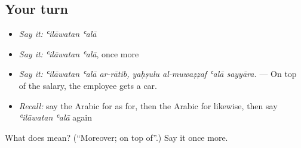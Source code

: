 \subsection*{Your turn}
\begin{itemize}
\raggedright
  \item \emph{Say it:} \emph{ʿilāwatan ʿalā}
  \item \emph{Say it:} \emph{ʿilāwatan ʿalā}, once more
  \item \emph{Say it:} \emph{ʿilāwatan ʿalā ar-rātib, yaḥṣulu al-muwaẓẓaf ʿalā sayyāra.} — On top of the salary, the employee gets a car.
  \item \emph{Recall:} say the Arabic for as for, then the Arabic for likewise, then say \emph{ʿilāwatan ʿalā} again
\end{itemize}

\begin{tcolorbox}[breakable,colback=teal!4,colframe=teal!35!black,title={Before you move on}]
What does   mean? (\textquotedblleft{}Moreover; on top of\textquotedblright{}.) Say it once more.
\end{tcolorbox}
